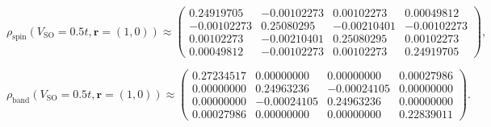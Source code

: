 \begin{equation}
\rho_{\mathrm{spin}}(V_{\mathrm{SO}}=0.5t,\mathbf r=(1,0))
\approx
\begin{pmatrix}
0.24919705 & -0.00102273 & 0.00102273 & 0.00049812 \\
-0.00102273 & 0.25080295 & -0.00210401 & -0.00102273 \\
0.00102273 & -0.00210401 & 0.25080295 & 0.00102273 \\
0.00049812 & -0.00102273 & 0.00102273 & 0.24919705
\end{pmatrix},
\end{equation}

\begin{equation}
\rho_{\mathrm{band}}(V_{\mathrm{SO}}=0.5t,\mathbf r=(1,0))
\approx
\begin{pmatrix}
0.27234517 & 0.00000000 & 0.00000000 & 0.00027986 \\
0.00000000 & 0.24963236 & -0.00024105 & 0.00000000 \\
0.00000000 & -0.00024105 & 0.24963236 & 0.00000000 \\
0.00027986 & 0.00000000 & 0.00000000 & 0.22839011
\end{pmatrix}.
\end{equation}
